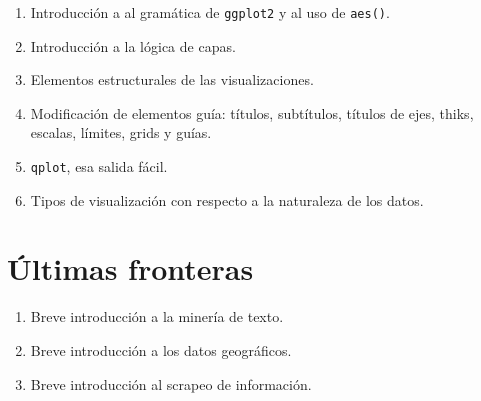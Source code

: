 \documentclass[]{article}
\providecommand{\tightlist}{%
  \setlength{\itemsep}{0pt}\setlength{\parskip}{0pt}}
\begin{document}
\begin{enumerate}
\def\labelenumi{\arabic{enumi}.}
\tightlist
\item
  Introducción a al gramática de \texttt{ggplot2} y al uso de
  \texttt{aes()}.
\item
  Introducción a la lógica de capas.
\item
  Elementos estructurales de las visualizaciones.
\item
  Modificación de elementos guía: títulos, subtítulos, títulos de ejes,
  thiks, escalas, límites, grids y guías.
\item
  \texttt{qplot}, esa salida fácil.
\item
  Tipos de visualización con respecto a la naturaleza de los datos.
\end{enumerate}

\section{Últimas fronteras}\label{ultimas-fronteras}

\begin{enumerate}
\def\labelenumi{\arabic{enumi}.}
\tightlist
\item
  Breve introducción a la minería de texto.
\item
  Breve introducción a los datos geográficos.
\item
  Breve introducción al scrapeo de información.
\end{enumerate}
\end{document}
